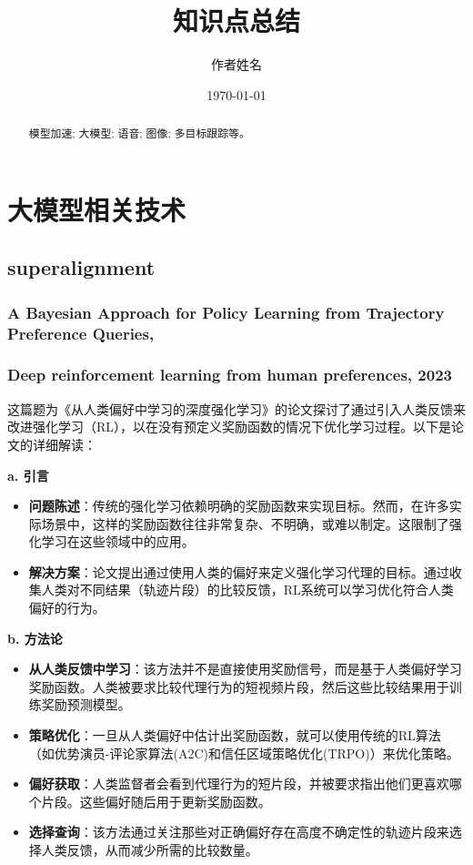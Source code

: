 \documentclass[twocolumn, 10pt]{article} %
\begin{document}
\title{知识点总结}
\author{作者姓名}
\date{\today}
\maketitle
\begin{abstract}
    模型加速; 大模型; 语音; 图像; 多目标跟踪等。
\end{abstract}


\section{大模型相关技术}

\subsection{superalignment}


\subsubsection{A Bayesian Approach for Policy Learning from Trajectory Preference Queries, }

\subsubsection{Deep reinforcement learning from human preferences,  2023}











这篇题为《从人类偏好中学习的深度强化学习》的论文探讨了通过引入人类反馈来改进强化学习（RL），以在没有预定义奖励函数的情况下优化学习过程。以下是论文的详细解读：

\noindent\textbf{a. 引言}
\begin{itemize}
    \item \textbf{问题陈述}：传统的强化学习依赖明确的奖励函数来实现目标。然而，在许多实际场景中，这样的奖励函数往往非常复杂、不明确，或难以制定。这限制了强化学习在这些领域中的应用。
    \item \textbf{解决方案}：论文提出通过使用人类的偏好来定义强化学习代理的目标。通过收集人类对不同结果（轨迹片段）的比较反馈，RL系统可以学习优化符合人类偏好的行为。
\end{itemize}

\noindent\textbf{b. 方法论}
\begin{itemize}
    \item \textbf{从人类反馈中学习}：该方法并不是直接使用奖励信号，而是基于人类偏好学习奖励函数。人类被要求比较代理行为的短视频片段，然后这些比较结果用于训练奖励预测模型。
    \item \textbf{策略优化}：一旦从人类偏好中估计出奖励函数，就可以使用传统的RL算法（如优势演员-评论家算法(A2C)和信任区域策略优化(TRPO)）来优化策略。
    \item \textbf{偏好获取}：人类监督者会看到代理行为的短片段，并被要求指出他们更喜欢哪个片段。这些偏好随后用于更新奖励函数。
    \item \textbf{选择查询}：该方法通过关注那些对正确偏好存在高度不确定性的轨迹片段来选择人类反馈，从而减少所需的比较数量。
\end{itemize}
\end{document}

